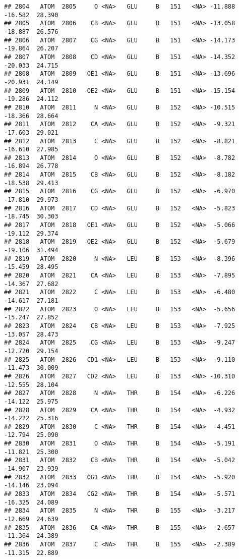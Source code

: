 \documentclass[
]{article}
\begin{document}
\begin{verbatim}
## 2804   ATOM  2805     O <NA>   GLU     B   151   <NA> -11.888 -16.582  28.390
## 2805   ATOM  2806    CB <NA>   GLU     B   151   <NA> -13.058 -18.887  26.576
## 2806   ATOM  2807    CG <NA>   GLU     B   151   <NA> -14.173 -19.864  26.207
## 2807   ATOM  2808    CD <NA>   GLU     B   151   <NA> -14.352 -20.033  24.715
## 2808   ATOM  2809   OE1 <NA>   GLU     B   151   <NA> -13.696 -20.931  24.149
## 2809   ATOM  2810   OE2 <NA>   GLU     B   151   <NA> -15.154 -19.286  24.112
## 2810   ATOM  2811     N <NA>   GLU     B   152   <NA> -10.515 -18.366  28.664
## 2811   ATOM  2812    CA <NA>   GLU     B   152   <NA>  -9.321 -17.603  29.021
## 2812   ATOM  2813     C <NA>   GLU     B   152   <NA>  -8.821 -16.610  27.985
## 2813   ATOM  2814     O <NA>   GLU     B   152   <NA>  -8.782 -16.894  26.778
## 2814   ATOM  2815    CB <NA>   GLU     B   152   <NA>  -8.182 -18.538  29.413
## 2815   ATOM  2816    CG <NA>   GLU     B   152   <NA>  -6.970 -17.810  29.973
## 2816   ATOM  2817    CD <NA>   GLU     B   152   <NA>  -5.823 -18.745  30.303
## 2817   ATOM  2818   OE1 <NA>   GLU     B   152   <NA>  -5.066 -19.112  29.374
## 2818   ATOM  2819   OE2 <NA>   GLU     B   152   <NA>  -5.679 -19.106  31.494
## 2819   ATOM  2820     N <NA>   LEU     B   153   <NA>  -8.396 -15.459  28.495
## 2820   ATOM  2821    CA <NA>   LEU     B   153   <NA>  -7.895 -14.367  27.682
## 2821   ATOM  2822     C <NA>   LEU     B   153   <NA>  -6.480 -14.617  27.181
## 2822   ATOM  2823     O <NA>   LEU     B   153   <NA>  -5.656 -15.247  27.852
## 2823   ATOM  2824    CB <NA>   LEU     B   153   <NA>  -7.925 -13.057  28.473
## 2824   ATOM  2825    CG <NA>   LEU     B   153   <NA>  -9.247 -12.720  29.154
## 2825   ATOM  2826   CD1 <NA>   LEU     B   153   <NA>  -9.110 -11.473  30.009
## 2826   ATOM  2827   CD2 <NA>   LEU     B   153   <NA> -10.310 -12.555  28.104
## 2827   ATOM  2828     N <NA>   THR     B   154   <NA>  -6.226 -14.122  25.975
## 2828   ATOM  2829    CA <NA>   THR     B   154   <NA>  -4.932 -14.222  25.316
## 2829   ATOM  2830     C <NA>   THR     B   154   <NA>  -4.451 -12.794  25.090
## 2830   ATOM  2831     O <NA>   THR     B   154   <NA>  -5.191 -11.821  25.300
## 2831   ATOM  2832    CB <NA>   THR     B   154   <NA>  -5.042 -14.907  23.939
## 2832   ATOM  2833   OG1 <NA>   THR     B   154   <NA>  -5.920 -14.146  23.094
## 2833   ATOM  2834   CG2 <NA>   THR     B   154   <NA>  -5.571 -16.325  24.089
## 2834   ATOM  2835     N <NA>   THR     B   155   <NA>  -3.217 -12.669  24.639
## 2835   ATOM  2836    CA <NA>   THR     B   155   <NA>  -2.657 -11.364  24.389
## 2836   ATOM  2837     C <NA>   THR     B   155   <NA>  -2.389 -11.315  22.889

\end{verbatim}
\end{document}
